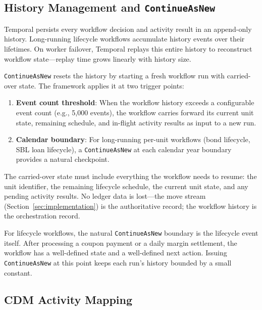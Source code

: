 \documentclass[11pt,a4paper]{article}
\begin{document}
\subsection{History Management and \texttt{ContinueAsNew}}
\label{sec:temporal-continueasnew}

Temporal persists every workflow decision and activity result in an append-only history. Long-running lifecycle workflows accumulate history events over their lifetimes. On worker failover, Temporal replays this entire history to reconstruct workflow state---replay time grows linearly with history size.

\texttt{ContinueAsNew} resets the history by starting a fresh workflow run with carried-over state. The framework applies it at two trigger points:

\begin{enumerate}[nosep]
\item \textbf{Event count threshold}: When the workflow history exceeds a configurable event count (e.g., 5{,}000 events), the workflow carries forward its current unit state, remaining schedule, and in-flight activity results as input to a new run.
\item \textbf{Calendar boundary}: For long-running per-unit workflows (bond lifecycle, SBL loan lifecycle), a \texttt{ContinueAsNew} at each calendar year boundary provides a natural checkpoint.
\end{enumerate}

\noindent The carried-over state must include everything the workflow needs to resume: the unit identifier, the remaining lifecycle schedule, the current unit state, and any pending activity results. No ledger data is lost---the move stream (Section~\ref{sec:implementation}) is the authoritative record; the workflow history is the orchestration record.

For lifecycle workflows, the natural \texttt{ContinueAsNew} boundary is the lifecycle event itself. After processing a coupon payment or a daily margin settlement, the workflow has a well-defined state and a well-defined next action. Issuing \texttt{ContinueAsNew} at this point keeps each run's history bounded by a small constant.

\subsection{CDM Activity Mapping}
\label{sec:temporal-cdm-mapping}
\end{document}
